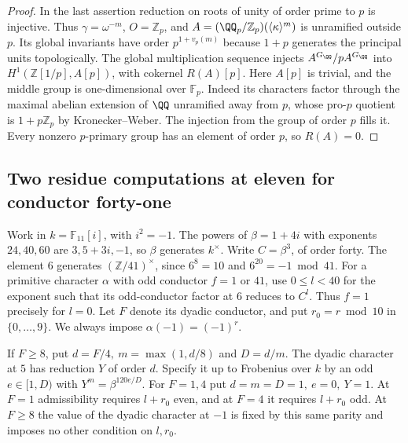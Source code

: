 \documentclass[a4paper,11pt]{article}
\theoremstyle{definition}
\theoremstyle{remark}
\newcommand{\ZZ}{\mathbb Z}\newcommand{\ord}{\operatorname{ord}}
\numberwithin{equation}{section}
\begin{document}
\begin{proof}
In the last assertion reduction on roots of unity of order prime
to \(p\) is injective. Thus \(\gamma=\omega^{-m}\), \(O=\ZZ_p\),
and \(A=(\QQ_p/\ZZ_p)(\langle\kappa\rangle^m)\) is unramified
outside \(p\). Its global invariants have order \(p^{1+v_p(m)}\)
because \(1+p\) generates the principal units topologically.
The global multiplication sequence injects \(A^{G_\QQ}/pA^{G_\QQ}\)
into \(H^1(\ZZ[1/p],A[p])\), with cokernel \(R(A)[p]\).
Here \(A[p]\) is trivial, and the middle group is one-dimensional
over \(\mathbb F_p\). Indeed its characters factor through the
maximal abelian extension of \(\QQ\) unramified away from \(p\),
whose pro-\(p\) quotient is \(1+p\ZZ_p\) by Kronecker--Weber.
The injection from the group of order \(p\) fills it. Every
nonzero \(p\)-primary group has an element of order \(p\), so
\(R(A)=0\).
\end{proof}

\subsection{Two residue computations at eleven for conductor forty-one}\label{nav:III-73}
Work in \(k=\mathbb F_{11}[i]\), with \(i^2=-1\).
The powers of \(\beta=1+4i\) with exponents \(24,40,60\)
are \(3,5+3i,-1\), so \(\beta\) generates \(k^\times\).
Write \(C=\beta^3\), of order forty. The element \(6\)
generates \((\ZZ/41)^\times\), since \(6^8=10\) and
\(6^{20}=-1\bmod41\). For a primitive character \(\alpha\)
with odd conductor \(f=1\) or \(41\), use \(0\le l<40\)
for the exponent such that its odd-conductor factor at \(6\)
reduces to \(C^l\). Thus \(f=1\) precisely for \(l=0\).
Let \(F\) denote its dyadic conductor, and put
\(r_0=r\bmod10\) in \(\{0,\ldots,9\}\). We always impose
\(\alpha(-1)=(-1)^r\).

If \(F\ge8\), put \(d=F/4,\ m=\max(1,d/8)\) and \(D=d/m\).
The dyadic character at \(5\) has reduction \(Y\) of order
\(d\). Specify it up to Frobenius over \(k\) by an odd
\(e\in[1,D)\) with \(Y^m=\beta^{120e/D}\). For \(F=1,4\)
put \(d=m=D=1,\ e=0,\ Y=1\). At \(F=1\) admissibility
requires \(l+r_0\) even, and at \(F=4\) it requires \(l+r_0\)
odd. At \(F\ge8\) the value of the dyadic character at \(-1\)
is fixed by this same parity and imposes no other condition on \(l,r_0\).
\end{document}
